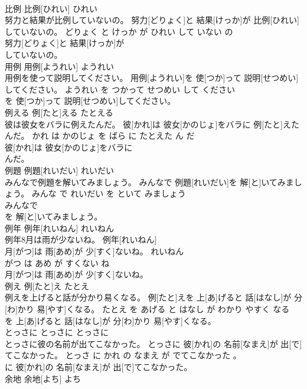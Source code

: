 \documentclass[8pt]{extreport}
\begin{document}
\begin{CJK}{UTF8}{min}
\\	比例	比例[ひれい]	ひれい	
\\	努力と結果が比例していないの。	努力[どりょく]と 結果[けっか]が 比例[ひれい]していないの。	どりょく と けっか が ひれい して いない の	
\\	努力[どりょく]と 結果[けっか]が
\\	していないの。			
\\	用例	用例[ようれい]	ようれい	
\\	用例を使って説明してください。	用例[ようれい]を 使[つか]って 説明[せつめい]してください。	ようれい を つかって せつめい して ください	
\\	を 使[つか]って 説明[せつめい]してください。			
\\	例える	例[たと]える	たとえる	
\\	彼は彼女をバラに例えたんだ。	彼[かれ]は 彼女[かのじょ]をバラに 例[たと]えたんだ。	かれ は かのじょ を ばら に たとえた ん だ	
\\	彼[かれ]は 彼女[かのじょ]をバラに
\\	んだ。			
\\	例題	例題[れいだい]	れいだい	
\\	みんなで例題を解いてみましょう。	みんなで 例題[れいだい]を 解[と]いてみましょう。	みんな で れいだい を といて みましょう	
\\	みんなで
\\	を 解[と]いてみましょう。			
\\	例年	例年[れいねん]	れいねん	
\\	例年8月は雨が少ないね。	例年[れいねん] 
\\	月[がつ]は 雨[あめ]が 少[すく]ないね。	れいねん 
\\	がつ は あめ が すくない ね	
\\	月[がつ]は 雨[あめ]が 少[すく]ないね。			
\\	例え	例[たと]え	たとえ	
\\	例えを上げると話が分かり易くなる。	例[たと]えを 上[あ]げると 話[はなし]が 分[わ]かり 易[やす]くなる。	たとえ を あげる と はなし が わかり やすく なる	
\\	を 上[あ]げると 話[はなし]が 分[わ]かり 易[やす]くなる。			
\\	とっさに	とっさに	とっさに	
\\	とっさに彼の名前が出てこなかった。	とっさに 彼[かれ]の 名前[なまえ]が 出[で]てこなかった。	とっさ に かれ の なまえ が でてこなかった 。	
\\	に 彼[かれ]の 名前[なまえ]が 出[で]てこなかった。			
\\	余地	余地[よち]	よち	

\end{CJK}
\end{document}
